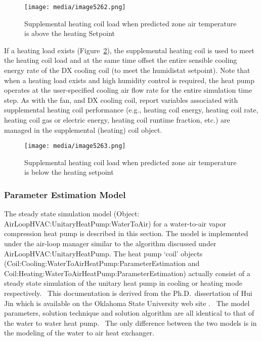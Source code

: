 \begin{figure}[hbtp] %
\centering
\texttt{[image: media/image5262.png]}
\caption{Supplemental heating coil load when predicted zone air temperature is above the heating Setpoint \protect \label{fig:supplemental-heating-coil-load-when-predicted-004}}
\end{figure}

If a heating load exists (Figure~\ref{fig:supplemental-heating-coil-load-when-predicted-005}), the supplemental heating coil is used to meet the heating coil load and at the same time offset the entire sensible cooling energy rate of the DX cooling coil (to meet the humidistat setpoint). Note that when a heating load exists and high humidity control is required, the heat pump operates at the user-specified cooling air flow rate for the entire simulation time step. As with the fan, and DX cooling coil, report variables associated with supplemental heating coil performance (e.g., heating coil energy, heating coil rate, heating coil gas or electric energy, heating coil runtime fraction, etc.) are managed in the supplemental (heating) coil object.

\begin{figure}[hbtp] %
\centering
\texttt{[image: media/image5263.png]}
\caption{Supplemental heating coil load when predicted zone air temperature is below the heating setpoint \protect \label{fig:supplemental-heating-coil-load-when-predicted-005}}
\end{figure}

\subsubsection{Parameter Estimation Model}\label{parameter-estimation-model}

The steady state simulation model (Object: AirLoopHVAC:UnitaryHeatPump:WaterToAir) for a water-to-air vapor compression heat pump is described in this section. The model is implemented under the air-loop manager similar to the algorithm discussed under AirLoopHVAC:UnitaryHeatPump. The heat pump `coil' objects \\
(Coil:Cooling:WaterToAirHeatPump:ParameterEstimation and Coil:Heating:WaterToAirHeatPump:ParameterEstimation) actually consist of a steady state simulation of the unitary heat pump in cooling or heating mode respectively.~ This documentation is derived from the Ph.D.~dissertation of Hui Jin which is available on the Oklahoma State University web site . ~The model parameters, solution technique and solution algorithm are all identical to that of the water to water heat pump.~ The only difference between the two models is in the modeling of the water to air heat exchanger.

